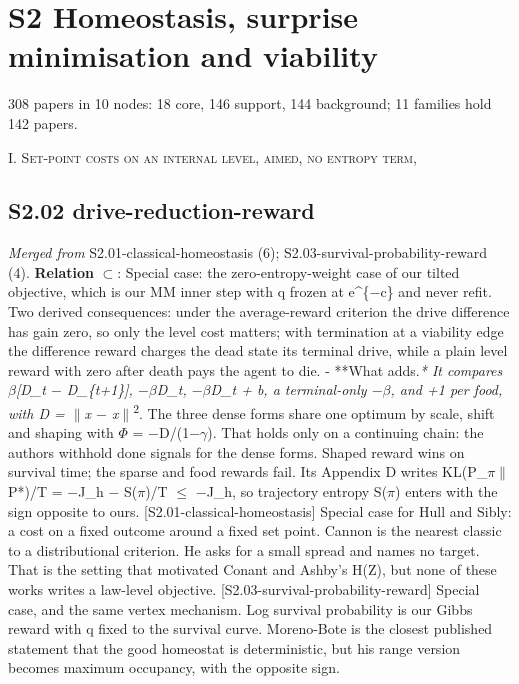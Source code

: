 \documentclass[10pt]{article}
\begin{document}
\section{S2 Homeostasis, surprise minimisation and viability}
308 papers in 10 nodes: 18 core, 146 support, 144 background; 11 families hold 142 papers.

\medskip\textsc{I. Set-point costs on an internal level, aimed, no entropy term,}

\subsection{S2.02 drive-reduction-reward}\label{node:S2-S2-02-drive-reduction-reward}
\textit{Merged from} S2.01-classical-homeostasis (6); S2.03-survival-probability-reward (4). \textbf{Relation} $\subset$: Special case: the zero-entropy-weight case of our tilted objective, which is our MM inner step with q frozen at e\^{}\{\ensuremath{-}c\} and never refit. Two derived consequences: under the average-reward criterion the drive difference has gain zero, so only the level cost matters; with termination at a viability edge the difference reward charges the dead state its terminal drive, while a plain level reward with zero after death pays the agent to die. - **What \citet{Yoshida-emergence24} adds.\emph{* It compares \ensuremath{\beta}[D\_t \ensuremath{-} D\_\{t+1\}], \ensuremath{-}\ensuremath{\beta}D\_t, \ensuremath{-}\ensuremath{\beta}D\_t + b, a terminal-only \ensuremath{-}\ensuremath{\beta}, and +1 per food, with D = \ensuremath{\|}x \ensuremath{-} x}\ensuremath{\|}\textsuperscript{2}. The three dense forms share one optimum by scale, shift and shaping with \ensuremath{\Phi} = \ensuremath{-}D/(1\ensuremath{-}\ensuremath{\gamma}). That holds only on a continuing chain: the authors withhold done signals for the dense forms. Shaped reward wins on survival time; the sparse and food rewards fail. Its Appendix D writes KL(P\_\ensuremath{\pi}\ensuremath{\|}P*)/T = \ensuremath{-}J\_h \ensuremath{-} S(\ensuremath{\pi})/T \ensuremath{\leq} \ensuremath{-}J\_h, so trajectory entropy S(\ensuremath{\pi}) enters with the sign opposite to ours. [S2.01-classical-homeostasis] Special case for Hull and Sibly: a cost on a fixed outcome around a fixed set point. Cannon is the nearest classic to a distributional criterion. He asks for a small spread and names no target. That is the setting that motivated Conant and Ashby's H(Z), but none of these works writes a law-level objective. [S2.03-survival-probability-reward] Special case, and the same vertex mechanism. Log survival probability is our Gibbs reward with q fixed to the survival curve. Moreno-Bote is the closest published statement that the good homeostat is deterministic, but his range version becomes maximum occupancy, with the opposite sign.
\end{document}
